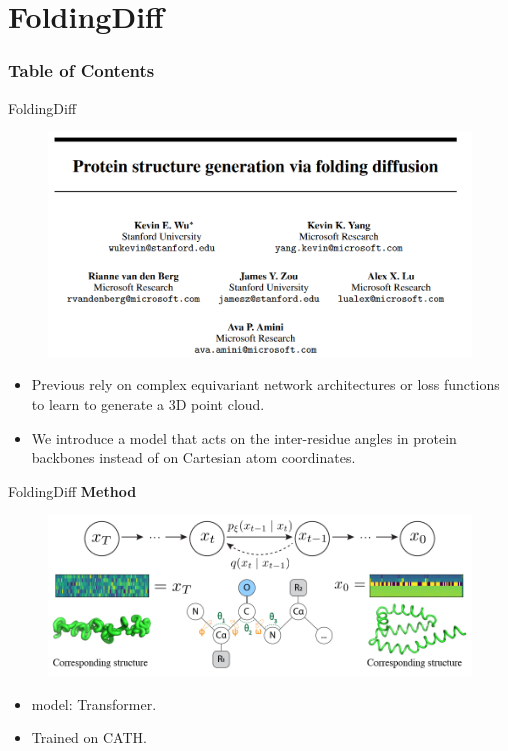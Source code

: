 \documentclass[notheorems, aspectratio=54]{beamer}
\begin{document}
\section{FoldingDiff}
\begin{frame}
    \frametitle{Table of Contents}
    \tableofcontents[currentsection]
\end{frame}

\begin{frame}{FoldingDiff}
  \vspace{-3mm}
  \begin{figure}[!h]
      \centering
      \includegraphics[width=0.9\linewidth]{figures/Foldingdiff.png}
  \end{figure}
  \vspace{-3mm}
  \begin{itemize}
    \item Previous rely on complex equivariant network architectures or loss functions to learn to generate a 3D point cloud.
    \item We introduce a model that acts on the inter-residue angles in protein backbones instead of on Cartesian atom coordinates.
  \end{itemize}
\end{frame}

\begin{frame}{FoldingDiff}
  \textbf{Method}
  \vspace{-3mm}
  \begin{figure}[!h]
      \centering
      \includegraphics[width=0.9\linewidth]{figures/Foldingdiff_fig1.png}
  \end{figure}
  \vspace{-3mm}
  \begin{itemize}
    \item model: Transformer.
    \item Trained on CATH.
  \end{itemize}
\end{frame}
\end{document}

